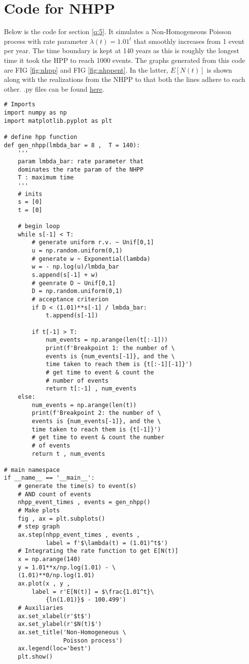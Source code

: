 \documentclass[%
 reprint,
 amsmath,amssymb,
 aps,
]{revtex4-2}
\theoremstyle{definition}
\begin{document}
\section{\label{app:nhppcode}Code for NHPP}
Below is the code for section \ref{q:5}. It simulates a Non-Homogeneous Poisson process with rate parameter $\lambda(t)=1.01^t$ that smoothly increases from 1 event per year. The time boundary is kept at 140 years as this is roughly the longest time it took the HPP to reach 1000 events. The graphs generated from this code are FIG \ref{fig:nhpp} and FIG \ref{fig:nhppent}. In the latter, $E[N(t)]$ is shown along with the realizations from the NHPP to that both the lines adhere to each other. .py files can be found \href{https://github.com/sourasen1011/Stochastic_Processes/blob/main/CA3/project_helper/NHPP.py}{here}.
\begin{verbatim}
# Imports
import numpy as np
import matplotlib.pyplot as plt

# define hpp function
def gen_nhpp(lmbda_bar = 8 ,  T = 140):
    '''
    param lmbda_bar: rate parameter that 
    dominates the rate param of the NHPP
    T : maximum time
    '''
    # inits
    s = [0]
    t = [0]

    # begin loop
    while s[-1] < T:
        # generate uniform r.v. ~ Unif[0,1]
        u = np.random.uniform(0,1)
        # generate w ~ Exponential(lambda) 
        w = - np.log(u)/lmbda_bar 
        s.append(s[-1] + w)
        # geenrate D ~ Unif[0,1]
        D = np.random.uniform(0,1)
        # acceptance criterion
        if D < (1.01)**s[-1] / lmbda_bar:
            t.append(s[-1])
        
        if t[-1] > T:
            num_events = np.arange(len(t[:-1]))
            print(f'Breakpoint 1: the number of \
            events is {num_events[-1]}, and the \
            time taken to reach them is {t[:-1][-1]}')
            # get time to event & count the 
            # number of events
            return t[:-1] , num_events
    else:
        num_events = np.arange(len(t))
        print(f'Breakpoint 2: the number of \
        events is {num_events[-1]}, and the \
        time taken to reach them is {t[-1]}')
        # get time to event & count the number 
        # of events
        return t , num_events

# main namespace
if __name__ == '__main__': 
    # generate the time(s) to event(s) 
    # AND count of events
    nhpp_event_times , events = gen_nhpp() 
    # Make plots
    fig , ax = plt.subplots()
    # step graph
    ax.step(nhpp_event_times , events , 
            label = f'$\lambda(t) = (1.01)^t$') 
    # Integrating the rate function to get E[N(t)]
    x = np.arange(140)
    y = 1.01**x/np.log(1.01) - \
    (1.01)**0/np.log(1.01)
    ax.plot(x , y , 
    	label = r'E[N(t)] = $\frac{1.01^t}\
            {ln(1.01)}$ - 100.499')
    # Auxiliaries
    ax.set_xlabel(r'$t$')
    ax.set_ylabel(r'$N(t)$')
    ax.set_title('Non-Homogeneous \
                 Poisson process')
    ax.legend(loc='best')
    plt.show()

\end{verbatim}

\nocite{*}

\end{document}
